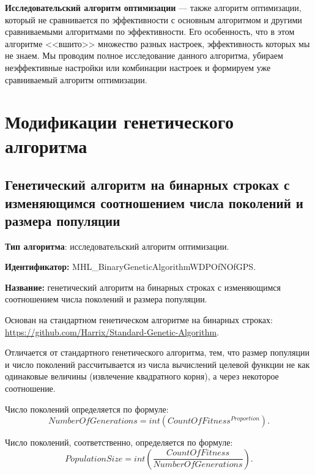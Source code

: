 \documentclass[a4paper,12pt]{article}
\begin{document}
\textbf{Исследовательский алгоритм оптимизации} --- также алгоритм оптимизации, который не сравнивается по эффективности с основным алгоритмом и другими сравниваемыми алгоритмами по эффективности. Его особенность, что в этом алгоритме <<вшито>> множество разных настроек, эффективность которых мы не знаем. Мы проводим полное исследование данного алгоритма, убираем неэффективные настройки или комбинации настроек и формируем уже сравниваемый алгоритм оптимизации.

\section{Модификации генетического алгоритма}\label{HarrixOptimizationAlgorithms:GA}

\subsection{Генетический алгоритм на бинарных строках с изменяющимся соотношением числа поколений и размера популяции}\label{HarrixOptimizationAlgorithms:GA001}

\textbf{Тип алгоритма}: исследовательский алгоритм оптимизации.

\textbf{Идентификатор:} MHL\_BinaryGeneticAlgorithmWDPOfNOfGPS.

\textbf{Название:} генетический алгоритм на бинарных строках с изменяющимся соотношением числа поколений и размера популяции.

Основан на стандартном генетическом алгоритме на бинарных строках:  \href{https://github.com/Harrix/Standard-Genetic-Algorithm}{https://github.com/Harrix/Standard-Genetic-Algorithm}. 

Отличается от стандартного генетического алгоритма, тем, что размер популяции и число поколений рассчитывается из числа вычислений целевой функции не как одинаковые величины (извлечение квадратного корня), а через некоторое соотношение.

Число поколений определяется по формуле:
\begin{equation}
NumberOfGenerations = int \left( CountOfFitness^{Proportion}\right).
\end{equation}

Число поколений, соответственно, определяется по формуле:
\begin{equation}
PopulationSize = int \left( \dfrac{CountOfFitness}{NumberOfGenerations}\right).
\end{equation}
\end{document}
